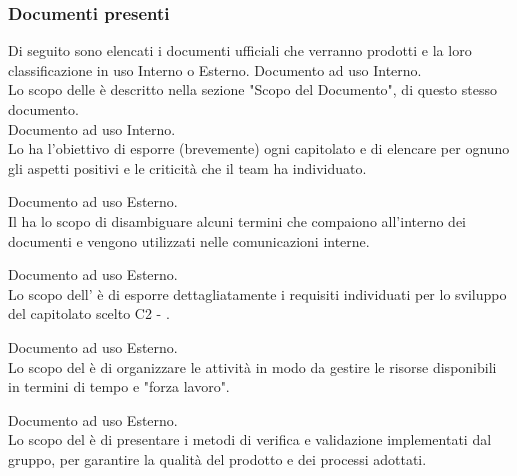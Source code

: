     \subsubsection{Documenti presenti}
      Di seguito sono elencati i documenti ufficiali che verranno prodotti e la loro classificazione in uso Interno o Esterno.
        Documento ad uso Interno.\\
        Lo scopo delle \textit{\NdP{}} è descritto nella sezione  "Scopo del Documento", di questo stesso documento.\\

        Documento ad uso Interno.\\
        Lo \textit{\SdF{}} ha l'obiettivo di esporre (brevemente) ogni capitolato e di elencare per ognuno gli aspetti positivi e le criticità che il team ha individuato.

        Documento ad uso Esterno.\\
       	Il \Glossario{}  ha lo scopo di disambiguare alcuni termini che compaiono all'interno dei documenti e vengono utilizzati nelle comunicazioni interne.

        Documento ad uso Esterno.\\
        Lo  scopo  dell'\textit{\AdR{}} è di esporre dettagliatamente i requisiti individuati per lo sviluppo del capitolato scelto C2 - \NomeProgetto{}.

        Documento ad uso Esterno.\\
        Lo scopo del \textit{\PdP{}} è di organizzare le attività in modo da gestire le risorse disponibili in termini di tempo e "forza lavoro".

        Documento ad uso Esterno.\\
        Lo scopo del \textit{\PdQ{}} è di presentare i metodi di verifica e validazione implementati dal gruppo, per garantire la qualità del prodotto e dei processi adottati.

